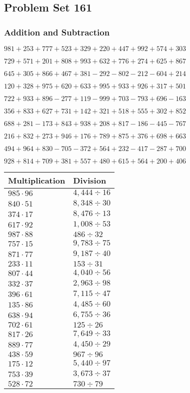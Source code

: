 \hypertarget{problem-set-161}{%
\subsection{Problem Set 161}\label{problem-set-161}}

\hypertarget{addition-and-subtraction}{%
\subsubsection{Addition and
Subtraction}\label{addition-and-subtraction}}

\(981 +253 +777 +523 +329 +220 +447 +992 +574 +303\)

\(729 +571 +201 +808 +993 +632 +776 +274 +625 +867\)

\(645 +305 +866 +467 +381 - 292 - 802 - 212 - 604 +214\)

\(120 +328 +975 +620 +633 +995 +933 +926 +317 +501\)

\(722 +933 +896 - 277 +119 - 999 +703 - 793 +696 - 163\)

\(356 +833 +627 +731 +142 +321 +518 +555 +302 +852\)

\(688 +281 - 173 +843 +938 +208 +817 - 186 - 445 - 767\)

\(216 +832 +273 +946 +176 +789 +875 +376 +698 +663\)

\(494 +964 +830 - 705 - 372 +564 +232 - 417 - 287 +700\)

\(928 +814 +709 +381 +557 +480 +615 +564 +200 +406\)

\begin{longtable}[]{@{}ll@{}}
\toprule
Multiplication & Division\tabularnewline
\midrule
\endhead
\(985 \cdot 96\) & \(4,444÷16\)\tabularnewline
\(840 \cdot 51\) & \(8,348÷30\)\tabularnewline
\(374 \cdot 17\) & \(8,476÷13\)\tabularnewline
\(617 \cdot 92\) & \(1,008÷53\)\tabularnewline
\(987 \cdot 88\) & \(486÷32\)\tabularnewline
\(757 \cdot 15\) & \(9,783÷75\)\tabularnewline
\(871 \cdot 77\) & \(9,187÷40\)\tabularnewline
\(233 \cdot 11\) & \(153÷31\)\tabularnewline
\(807 \cdot 44\) & \(4,040÷56\)\tabularnewline
\(332 \cdot 37\) & \(2,963÷98\)\tabularnewline
\(396 \cdot 61\) & \(7,115÷47\)\tabularnewline
\(135 \cdot 86\) & \(4,485÷60\)\tabularnewline
\(638 \cdot 94\) & \(6,755÷36\)\tabularnewline
\(702 \cdot 61\) & \(125÷26\)\tabularnewline
\(817 \cdot 26\) & \(7,649÷33\)\tabularnewline
\(889 \cdot 77\) & \(4,450÷29\)\tabularnewline
\(438 \cdot 59\) & \(967÷96\)\tabularnewline
\(175 \cdot 12\) & \(5,440÷97\)\tabularnewline
\(753 \cdot 39\) & \(3,673÷37\)\tabularnewline
\(528 \cdot 72\) & \(730÷79\)\tabularnewline
\bottomrule
\end{longtable}
